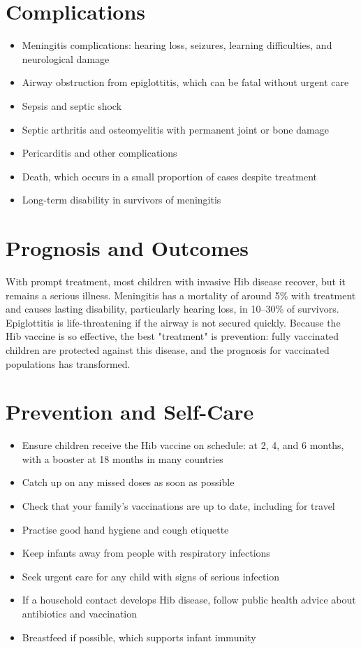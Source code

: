 \section*{Complications}
\begin{itemize}
    \item Meningitis complications: hearing loss, seizures, learning difficulties, and neurological damage
    \item Airway obstruction from epiglottitis, which can be fatal without urgent care
    \item Sepsis and septic shock
    \item Septic arthritis and osteomyelitis with permanent joint or bone damage
    \item Pericarditis and other complications
    \item Death, which occurs in a small proportion of cases despite treatment
    \item Long-term disability in survivors of meningitis
\end{itemize}

\section*{Prognosis and Outcomes}
With prompt treatment, most children with invasive Hib disease recover, but it remains a serious illness. Meningitis has a mortality of around 5\% with treatment and causes lasting disability, particularly hearing loss, in 10--30\% of survivors. Epiglottitis is life-threatening if the airway is not secured quickly. Because the Hib vaccine is so effective, the best "treatment" is prevention: fully vaccinated children are protected against this disease, and the prognosis for vaccinated populations has transformed.

\section*{Prevention and Self-Care}
\begin{itemize}
    \item Ensure children receive the Hib vaccine on schedule: at 2, 4, and 6 months, with a booster at 18 months in many countries
    \item Catch up on any missed doses as soon as possible
    \item Check that your family's vaccinations are up to date, including for travel
    \item Practise good hand hygiene and cough etiquette
    \item Keep infants away from people with respiratory infections
    \item Seek urgent care for any child with signs of serious infection
    \item If a household contact develops Hib disease, follow public health advice about antibiotics and vaccination
    \item Breastfeed if possible, which supports infant immunity
\end{itemize}

